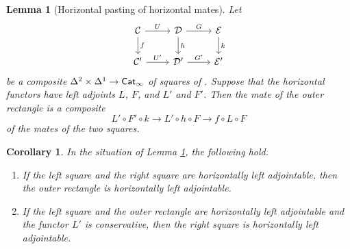 \documentclass[10pt, reqno, twoside
, final
]{amsart}
\numberwithin{equation}{subsection}%
\theoremstyle{definition}
\theoremstyle{definition}
\theoremstyle{definition}
\theoremstyle{definition}
\theoremstyle{definition}
\theoremstyle{definition}
\theoremstyle{definition}
\theoremstyle{definition}
\theoremstyle{definition}
\theoremstyle{plain}
\theoremstyle{definition}
\theoremstyle{plain}
\theoremstyle{definition}
\theoremstyle{plain}
\newtheorem{cor}[defn]{Corollary}
\theoremstyle{definition}
\theoremstyle{definition}
\theoremstyle{plain}
\newtheorem{lem}[defn]{Lemma}
\theoremstyle{plain}
\theoremstyle{definition}
\theoremstyle{plain}
\theoremstyle{plain}
\theoremstyle{plain}
\begin{document}
\begin{lem}[Horizontal pasting of horizontal mates]\label{lem:pastingofmates2}
Let
\[
\begin{tikzcd}
    \icat \ar[d,"f"] \ar[r,"U"] & \icatd \ar[d,"h"] \ar[r,"G"] & \icate \ar[d,"k"]\\
    \icat'\ar[r,"U'"] &  \icatd' \ar[r,"G'"] & \icate'
\end{tikzcd}
\]
be a composite $\Delta^2\times\Delta^1\rightarrow \mathsf{Cat}_{\infty}$ of squares of \infcatst. Suppose that the horizontal functors have left adjoints $L$, $F$, and $L'$ and $F'$. Then the mate of the outer rectangle is a composite
\[  L'\circ F'\circ k\longrightarrow L'\circ h\circ F\longrightarrow f\circ L\circ F   \]
of the mates of the two squares. 
\end{lem}
\begin{cor}\label{cor:pastingofmates2}
In the situation of Lemma \ref{lem:pastingofmates2}, the following hold.
\begin{enumerate}[$(1)$]
    \item If the left square and the right square are horizontally left adjointable, then the outer rectangle is horizontally left adjointable.
    \item If the left square and the outer rectangle are horizontally left adjointable \emph{and} the functor $L'$ is conservative, then the right square is horizontally left adjointable.
\end{enumerate}
\end{cor}
\end{document}
